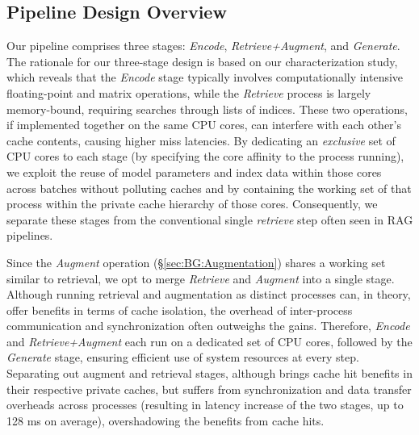 \noindent
\subsection{Pipeline Design Overview}
\label{subsec:pipeline_design}
Our pipeline comprises three stages: \emph{Encode}, \emph{Retrieve+Augment}, and \emph{Generate}. 
The rationale for our three-stage design is based on our characterization study, which reveals that the \emph{Encode} stage typically involves computationally intensive floating-point and matrix operations, while the \emph{Retrieve} process is largely memory-bound, requiring searches through lists of indices. These two operations, if implemented together on the same CPU cores, can interfere with each other’s cache contents, causing higher miss latencies. By dedicating an \emph{exclusive} set of CPU cores to each stage (by specifying the core affinity to the process running), we exploit the reuse of model parameters and index data within those cores across batches without polluting caches and by containing the working set of that process within the private cache hierarchy of those cores. Consequently, we separate these stages from the conventional single \emph{retrieve} step often seen in RAG pipelines. 

Since the \emph{Augment} operation (\S\ref{sec:BG:Augmentation}) shares a working set similar to retrieval, we opt to merge \emph{Retrieve} and \emph{Augment} into a single stage. Although running retrieval and augmentation as distinct processes can, in theory, offer benefits in terms of cache isolation, the overhead of inter-process communication and synchronization often outweighs the gains. Therefore, \emph{Encode} and \emph{Retrieve+Augment} each run on a dedicated set of CPU cores, followed by the \emph{Generate} stage, ensuring efficient use of system resources at every step. 
Separating out augment and retrieval stages, although brings cache hit benefits in their respective private caches, but suffers from synchronization and data transfer overheads across processes (resulting in latency increase of the two stages, up to 128 ms on average), overshadowing the benefits from cache hits.

